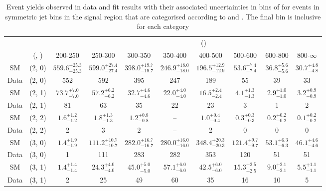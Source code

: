 \begin{table}[h!]
\tiny
\centering
\caption{Event yields observed in data and fit results with their associated uncertainties in bins of \scalht for events in symmetric jet bins in the signal region that are categorised according to \njet and \nb.
The final \scalht bin is inclusive for each category \label{tab:yieldsewkdatapost_sig_comb_sym}}
\begin{tabular}
{cccccccccc}
	\hline\hline
&	&	& \multicolumn{8}{c}{\scalht (\gev)}\\ 
	&	 (\njet, \nb) & 200-250 & 250-300 & 300-350 & 350-400 & 400-500 & 500-600 & 600-800 & 800-$\infty$ \\ [0.8ex] 
\hline
	SM & (2, 0) & $559.6^{+ 25.3 }_{- 25.3 }$ & $599.0^{+ 27.4 }_{- 27.4 }$ & $398.0^{+ 19.7 }_{- 19.7 }$ & $246.9^{+ 18.0 }_{- 18.0 }$ & $196.5^{+ 12.9 }_{- 12.9 }$ & $53.6^{+ 7.4 }_{- 7.4 }$ & $36.8^{+ 5.6 }_{- 5.6 }$ & $30.7^{+ 4.8 }_{- 4.8 }$ \\[0.5ex] 
	Data & (2, 0) & 552 & 592 & 395 & 247 & 189 & 55 & 39 & 33 \\[0.5ex] 
	SM & (2, 1) & $73.7^{+ 7.0 }_{- 7.0 }$ & $57.2^{+ 6.2 }_{- 6.2 }$ & $32.7^{+ 4.6 }_{- 4.6 }$ & $22.0^{+ 4.0 }_{- 4.0 }$ & $16.5^{+ 2.4 }_{- 2.4 }$ & $4.1^{+ 1.3 }_{- 1.3 }$ & $2.9^{+ 1.0 }_{- 1.0 }$ & $3.2^{+ 0.9 }_{- 0.9 }$ \\[0.5ex] 
	Data & (2, 1) & 81 & 63 & 35 & 22 & 23 & 3 & 1 & 2 \\[0.5ex] 
	SM & (2, 2) & $1.6^{+ 1.2 }_{- 1.2 }$ & $1.8^{+ 1.3 }_{- 1.3 }$ & $1.2^{+ 0.8 }_{- 0.8 }$ & -- & $1.0^{+ 0.4 }_{- 0.4 }$ & $0.3^{+ 0.3 }_{- 0.3 }$ & $0.2^{+ 0.2 }_{- 0.2 }$ & $0.1^{+ 0.2 }_{- 0.2 }$ \\[0.5ex] 
	Data & (2, 2) & 2 & 3 & 2 & -- & 2 & 0 & 0 & 0 \\[0.5ex] 
	SM & (3, 0) & $1.4^{+ 1.9 }_{- 1.9 }$ & $111.2^{+ 10.7 }_{- 10.7 }$ & $282.0^{+ 16.7 }_{- 16.7 }$ & $280.0^{+ 16.0 }_{- 16.0 }$ & $348.4^{+ 20.3 }_{- 20.3 }$ & $121.4^{+ 9.7 }_{- 9.7 }$ & $53.1^{+ 6.3 }_{- 6.3 }$ & $46.1^{+ 4.6 }_{- 4.6 }$ \\[0.5ex] 
	Data & (3, 0) & 1 & 111 & 283 & 282 & 353 & 120 & 51 & 51 \\[0.5ex] 
	SM & (3, 1) & $1.4^{+ 1.4 }_{- 1.4 }$ & $24.3^{+ 4.0 }_{- 4.0 }$ & $45.0^{+ 5.0 }_{- 5.0 }$ & $57.1^{+ 6.0 }_{- 6.0 }$ & $42.5^{+ 6.0 }_{- 6.0 }$ & $15.3^{+ 2.5 }_{- 2.5 }$ & $9.0^{+ 2.1 }_{- 2.1 }$ & $5.5^{+ 1.1 }_{- 1.1 }$ \\[0.5ex] 
	Data & (3, 1) & 2 & 25 & 49 & 60 & 35 & 16 & 10 & 5 \\[0.5ex] 

\end{tabular}
\end{table}
